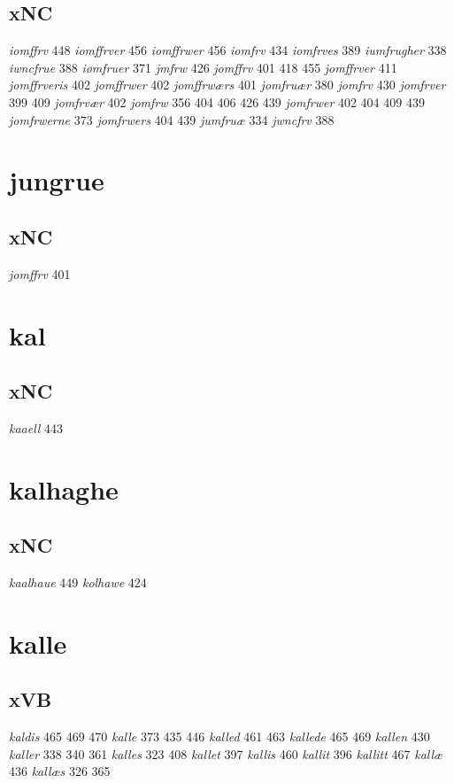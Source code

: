 \documentclass[a4paper,twocolumn]{article}
\begin{document}
\subsection{xNC}
\label{sec:org1138317}
\emph{iomffrv} 448 \emph{iomffrver} 456 \emph{iomffrwer} 456 \emph{iomfrv} 434 \emph{iomfrves} 389 \emph{iumfrugher} 338 \emph{iwncfrue} 388 \emph{iømfruer} 371 \emph{jmfrw} 426 \emph{jomffrv} 401 418 455 \emph{jomffrver} 411 \emph{jomffrveris} 402 \emph{jomffrwer} 402 \emph{jomffrwærs} 401 \emph{jomfruær} 380 \emph{jomfrv} 430 \emph{jomfrver} 399 409 \emph{jomfrvær} 402 \emph{jomfrw} 356 404 406 426 439 \emph{jomfrwer} 402 404 409 439 \emph{jomfrwerne} 373 \emph{jomfrwers} 404 439 \emph{jumfruæ} 334 \emph{jwncfrv} 388 
\section{jungrue}
\label{sec:orgbcfa9bb}
\subsection{xNC}
\label{sec:orgedae33b}
\emph{jomffrv} 401 
\section{kal}
\label{sec:orgbd0491e}
\subsection{xNC}
\label{sec:orgeb67b29}
\emph{kaaell} 443 
\section{kalhaghe}
\label{sec:orgb9a2ce6}
\subsection{xNC}
\label{sec:org0622f39}
\emph{kaalhaue} 449 \emph{kolhawe} 424 
\section{kalle}
\label{sec:org04f416d}
\subsection{xVB}
\label{sec:org0a6bfe1}
\emph{kaldis} 465 469 470 \emph{kalle} 373 435 446 \emph{kalled} 461 463 \emph{kallede} 465 469 \emph{kallen} 430 \emph{kaller} 338 340 361 \emph{kalles} 323 408 \emph{kallet} 397 \emph{kallis} 460 \emph{kallit} 396 \emph{kallitt} 467 \emph{kallæ} 436 \emph{kallæs} 326 365 
\end{document}
